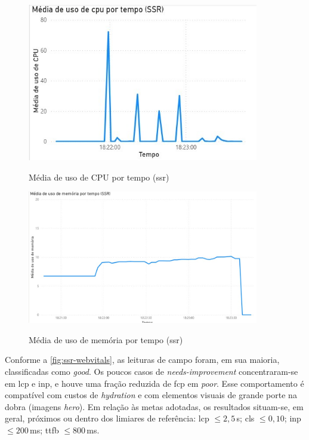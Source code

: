 {\begin{figure}[H]
    \centering
    \caption{Média de uso de CPU por tempo (\acrshort{ssr})}
    \includegraphics[width=0.9\textwidth]{media/uso_cpu_ssr.jpeg}
    \label{fig:ssr-cpu}
\end{figure}

\begin{figure}[H]
    \centering
    \caption{Média de uso de memória por tempo (\acrshort{ssr})}
    \includegraphics[width=0.9\textwidth]{media/uso_memoria_ssr.jpeg}
    \label{fig:ssr-mem}
\end{figure}

Conforme a \autoref{fig:ssr-webvitals}, as leituras de campo foram, em sua maioria, classificadas como \textit{good}. Os poucos casos de \textit{needs-improvement} concentraram-se em \acrshort{lcp} e \acrshort{inp}, e houve uma fração reduzida de \acrshort{fcp} em \textit{poor}. Esse comportamento é compatível com custos de \textit{hydration} e com elementos visuais de grande porte na dobra (imagens \emph{hero}). Em relação às metas adotadas, os resultados situam-se, em geral, próximos ou dentro dos limiares de referência: \acrshort{lcp} $\leq 2{,}5$\,s; \acrshort{cls} $\leq 0{,}10$; \acrshort{inp} $\leq 200$\,ms; \acrshort{ttfb} $\leq 800$\,ms.

}

